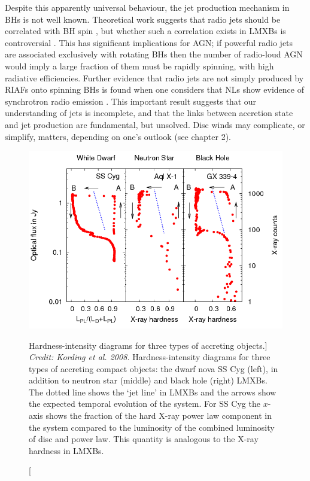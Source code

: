 Despite this apparently universal behaviour, 
the jet production mechanism in BHs is not well known. 
Theoretical work suggests that radio jets should be correlated with BH spin 
\citep{penrose1971,blandford1977}, 
but whether such a correlation exists in LMXBs is 
controversial \citep{fender2010,narayan2012}.
This has significant implications for AGN; if powerful radio jets are 
associated exclusively with rotating BHs then the number of radio-loud AGN
would imply a large fraction of them must be rapidly spinning, with
high radiative efficiencies. 
Further evidence that radio jets are not simply produced by RIAFs onto spinning
BHs is found when one considers that NLs show evidence of synchrotron
radio emission \citep{coppejans2015}. This important result suggests that our understanding
of jets is incomplete, and that the links between accretion state and 
jet production are fundamental, but unsolved. Disc winds may complicate, or simplify,
matters, depending on one's outlook (see chapter 2).

\begin{figure}
\centering
\includegraphics[width=1.0\textwidth]{figures/01-intro/kording_hid.png}
\caption
[Hardness-intensity diagrams for three types of accreting objects.]
{
{\sl Credit: Kording et al. 2008.} 
Hardness-intensity diagrams for three types of accreting compact objects:
the dwarf nova SS Cyg (left), in addition to neutron star (middle) and black hole (right) 
LMXBs. The dotted line shows the `jet line' in LMXBs and the arrows show the 
expected temporal evolution of the system. For SS Cyg the $x$-axis shows the 
fraction of the hard X-ray power law component in the system compared to the 
luminosity of the combined luminosity of disc and power law. This quantity is
analogous to the X-ray hardness in LMXBs.
} 
\label{fig:kording_hid}
\end{figure}

